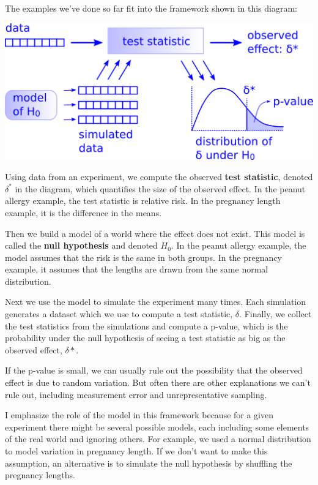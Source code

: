 The examples we've done so far fit into the framework shown in this
diagram:

\includegraphics{chapters/figs/hypothesis_testing.png}

Using data from an experiment, we compute the observed \textbf{test
statistic}, denoted \(\delta^*\) in the diagram, which quantifies the
size of the observed effect. In the peanut allergy example, the test
statistic is relative risk. In the pregnancy length example, it is the
difference in the means.

Then we build a model of a world where the effect does not exist. This
model is called the \textbf{null hypothesis} and denoted \(H_0\). In the
peanut allergy example, the model assumes that the risk is the same in
both groups. In the pregnancy example, it assumes that the lengths are
drawn from the same normal distribution.

Next we use the model to simulate the experiment many times. Each
simulation generates a dataset which we use to compute a test statistic,
\(\delta\). Finally, we collect the test statistics from the simulations
and compute a p-value, which is the probability under the null
hypothesis of seeing a test statistic as big as the observed effect,
\(\delta*\).

If the p-value is small, we can usually rule out the possibility that
the observed effect is due to random variation. But often there are
other explanations we can't rule out, including measurement error and
unrepresentative sampling.

I emphasize the role of the model in this framework because for a given
experiment there might be several possible models, each including some
elements of the real world and ignoring others. For example, we used a
normal distribution to model variation in pregnancy length. If we don't
want to make this assumption, an alternative is to simulate the null
hypothesis by shuffling the pregnancy lengths.

